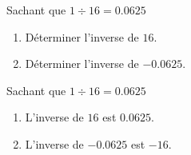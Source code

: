 \begin{exercice*}
    Sachant que $1\div 16 = \num{0.0625}$    
        \begin{enumerate}
            \item Déterminer l'inverse de $16$.
            \item Déterminer l'inverse de $-\num{0.0625}$.
        \end{enumerate}
\end{exercice*}
\begin{corrige}
    Sachant que $1\div 16 = \num{0.0625}$    
        \begin{enumerate}
            \item L'inverse de $16$ est $\num{0.0625}$.
            \item L'inverse de $-\num{0.0625}$ est $-16$.
        \end{enumerate}
\end{corrige}

